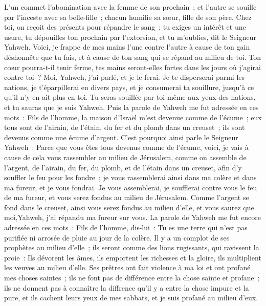 \begin{multicols}{2}
L'un commet l'abomination avec la femme de son prochain~; et l'autre se souille par l'inceste avec sa belle-fille~; chacun humilie sa sœur, fille de son père.
Chez toi, on reçoit des présents pour répandre le sang~; tu exiges un intérêt et une usure, tu dépouilles ton prochain par l'extorsion, et tu m'oublies, dit le Seigneur Yahweh.
Voici, je frappe de mes mains l'une contre l'autre à cause de ton gain déshonnête que tu fais, et à cause de ton sang qui se répand au milieu de toi.
Ton cœur pourra-t-il tenir ferme, tes mains seront-elles fortes dans les jours où j'agirai contre toi~? Moi, Yahweh, j'ai parlé, et je le ferai.
Je te disperserai parmi les nations, je t'éparpillerai en divers pays, et je consumerai ta souillure, jusqu'à ce qu'il n'y en ait plus en toi.
Tu seras souillée par toi-même aux yeux des nations, et tu sauras que je suis Yahweh.
Puis la parole de Yahweh me fut adressée en ces mots~:
Fils de l'homme, la maison d'Israël m'est devenue comme de l'écume~; eux tous sont de l'airain, de l'étain, du fer et du plomb dans un creuset~; ils sont devenus comme une écume d'argent.
C'est pourquoi ainsi parle le Seigneur Yahweh~: Parce que vous êtes tous devenus comme de l'écume, voici, je vais à cause de cela vous rassembler au milieu de Jérusalem,
comme on assemble de l'argent, de l'airain, du fer, du plomb, et de l'étain dans un creuset, afin d'y souffler le feu pour les fondre~; je vous rassemblerai ainsi dans ma colère et dans ma fureur, et je vous fondrai.
Je vous assemblerai, je soufflerai contre vous le feu de ma fureur, et vous serez fondus au milieu de Jérusalem.
Comme l'argent se fond dans le creuset, ainsi vous serez fondus au milieu d'elle, et vous saurez que moi,Yahweh, j'ai répandu ma fureur sur vous.
La parole de Yahweh me fut encore adressée en ces mots~:
Fils de l'homme, dis-lui~: Tu es une terre qui n'est pas purifiée ni arrosée de pluie au jour de la colère.
Il y a un complot de ses prophètes au milieu d'elle~; ils seront comme des lions rugissants, qui ravissent la proie~: Ils dévorent les âmes, ils emportent les richesses et la gloire, ils multiplient les veuves au milieu d'elle.
Ses prêtres ont fait violence à ma loi et ont profané mes choses saintes~; ils ne font pas de différence entre la chose sainte et profane~; ils ne donnent pas à connaître la diffrence qu'il y a entre la chose impure et la pure, et ils cachent leurs yeux de mes sabbats, et je suis profané au milieu d'eux.

\end{multicols}
